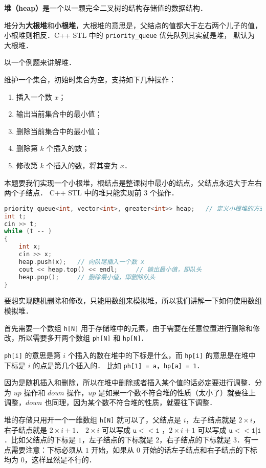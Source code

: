
\textbf{堆（heap）}是一个以一颗完全二叉树的结构存储值的数据结构．

堆分为\textbf{大根堆}和\textbf{小根堆}，大根堆的意思是，父结点的值都大于左右两个儿子的值，小根堆则相反．C++ STL 中的 \verb|priority_queue| 优先队列其实就是堆， 默认为大根堆．

以一个例题来讲解堆．

维护一个集合，初始时集合为空，支持如下几种操作：
\begin{enumerate}
\item 插入一个数 $x$；
\item 输出当前集合中的最小值；
\item 删除当前集合中的最小值；
\item 删除第 $k$ 个插入的数；
\item 修改第 $k$ 个插入的数，将其变为 $x$．
\end{enumerate}

本题要我们实现一个小根堆，根结点是整课树中最小的结点，父结点永远大于左右两个子结点．
C++ STL 中的堆只能实现前 $3$ 个操作．
\begin{lstlisting}[language=cpp]
priority_queue<int, vector<int>, greater<int>> heap;   // 定义小根堆的方式
int t;
cin >> t;
while (t -- )
{
    int x;            
    cin >> x;
    heap.push(x);   // 向队尾插入一个数 x
    cout << heap.top() << endl;     // 输出最小值，即队头
    heap.pop();     // 删除最小值，即删除队头
}
\end{lstlisting}

要想实现随机删除和修改，只能用数组来模拟堆，所以我们讲解一下如何使用数组模拟堆．

首先需要一个数组 \verb|h[N]| 用于存储堆中的元素，由于需要在任意位置进行删除和修改，所以需要多开两个数组 \verb|ph[N]| 和 \verb|hp[N]|．

\verb|ph[i]| 的意思是第 $i$ 个插入的数在堆中的下标是什么，而 \verb|hp[i]| 的意思是在堆中下标是 $i$ 的点是第几个插入的．
比如 \verb|ph[1] = a|，\verb|hp[a] = 1|．

因为是随机插入和删除，所以在堆中删除或者插入某个值的话必定要进行调整．分为 $up$ 操作和 $down$ 操作，$up$ 是如果一个数不符合堆的性质（太小了）就要往上调整，$down$ 也同理，因为某个数不符合堆的性质，就要往下调整．

堆的存储只用开一个一维数组 \verb|h[N]| 就可以了，父结点是 $i$，左子结点就是 $2 \times i$，右子结点就是 $2 \times i + 1$．
$2 \times i$ 可以写成 $\mathtt{u << 1}$ ，$2 \times i + 1$ 可以写成 $\mathtt{u << 1 | 1}$．比如父结点的下标是 $1$，左子结点的下标就是 $2$，右子结点的下标就是 $3$．有一点需要注意：下标必须从 $1$ 开始，如果从 $0$ 开始的话左子结点和右子结点的下标均为 $0$，这样显然是不行的．

